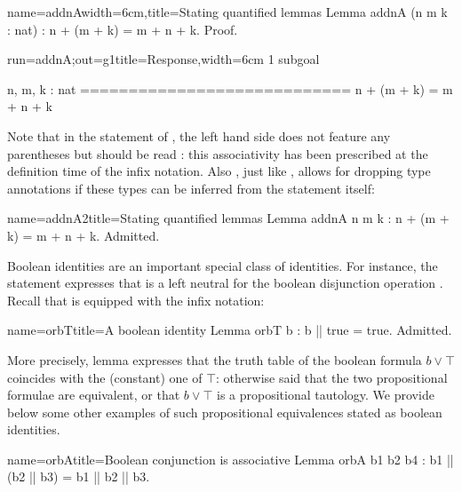 \begin{coq}{name=addnA}{width=6cm,title=Stating quantified lemmas}
Lemma addnA (n m k : nat) :
  n + (m + k) = m + n + k.
Proof.
\end{coq}
\begin{coqout}{run=addnA;out=g1}{title=Response,width=6cm}
1 subgoal

 n, m, k : nat
 ============================
  n + (m + k) = m + n + k
\end{coqout}

Note that in the statement of , the left hand side does not
feature any parentheses but should be read : this
associativity has been prescribed at the definition time of the infix
\C{+} notation. Also
, just like , allows for
dropping type annotations if these types can be inferred from the
statement itself:

\begin{coq}{name=addnA2}{title=Stating quantified lemmas}
Lemma addnA n m k : n + (m + k) = m + n + k.
Admitted.
\end{coq}


Boolean identities are an important special class of identities. For
instance, the~ statement expresses that  is a left
neutral for the boolean disjunction operation . Recall that
 is equipped with the \C{||} infix notation:

\begin{coq}{name=orbT}{title=A boolean identity}
Lemma orbT b : b || true = true.
Admitted.
\end{coq}

More precisely, lemma 
expresses that the truth table of the boolean formula $b \vee \top$
coincides with the (constant) one of $\top$: otherwise said that the
two propositional formulae are equivalent, or that $b \vee \top$ is a
propositional tautology. We provide below some other examples of such
propositional equivalences stated as boolean identities.

\begin{coq}{name=orbA}{title=Boolean conjunction is associative}
Lemma orbA b1 b2 b4 :
  b1 || (b2 || b3) = b1 || b2 || b3.
\end{coq}

